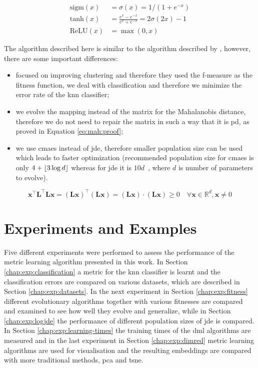 \documentclass[12pt,a4paper]{report}
\begin{document}
\begin{align}
\text{sigm}(x) &= \sigma(x) = 1/(1+e^{-x}) \label{eq:nn:sigm} \\
\text{tanh}(x) &= \frac{e^x-e^{-x}}{e^x+e^{-x}} = 2\sigma(2x)-1 \label{eq:nn:tanh} \\
\text{ReLU}(x) &= \max(0,x) \label{eq:nn:relu}
\end{align}

The algorithm described here is similar to the algorithm described by \citep{fukui2013evolutionary}, however, there are some important differences:
\begin{itemize}
\item \citep{fukui2013evolutionary} focused on improving clustering and therefore they used the f-measure as the fitness function, we deal with classification and therefore we minimize the error rate of the \ac{knn} classifier;
\item we evolve the mapping instead of the matrix for the Mahalanobis distance, therefore we do not need to repair the matrix in such a way that it is \ac{pd}, as proved in Equation \ref{eq:mah:proof};
\item we use \ac{cmaes} instead of \ac{jde}, therefore smaller population size can be used which leads to faster optimization (recommended population size for \ac{cmaes} is only $4+\lfloor3\log{d}\rfloor$ \citep{hansen2006cma} whereas for \ac{jde} it is $10d$~\citep{brest2006self}, where $d$ is number of parameters to evolve).
\end{itemize}

\begin{equation}
\bm{x}^\top \bm{L}^\top \bm{L}\bm{x}=(\bm{Lx})^\top(\bm{Lx})=(\bm{Lx})\cdot (\bm{Lx})\geq 0 \quad \forall \bm{x} \in \mathbb{R}^d, \bm{x} \neq 0 \label{eq:mah:proof}
\end{equation}



\chapter{Experiments and Examples} \label{chap:exp}
Five different experiments were performed to assess the performance of the metric learning algorithm presented in this work. In Section \ref{chap:exp:classification} a metric for the \ac{knn} classifier is learnt and the classification errors are compared on various datasets, which are described in Section \ref{chap:exp:datasets}. In the next experiment in Section \ref{chap:exp:fitness} different evolutionary algorithms together with various fitnesses  are compared and examined to see how well they evolve and generalize, while in Section \ref{chap:exp:logjde} the performance of different population sizes of \ac{jde} is compared. In Section \ref{chap:exp:learning-times} the training times of the \ac{dml} algorithms are measured and in the last experiment in Section \ref{chap:exp:dimred} metric learning algorithms are used for visualisation and the resulting embeddings are compared with more traditional methods, \ac{pca} and \ac{tsne}.
\end{document}
